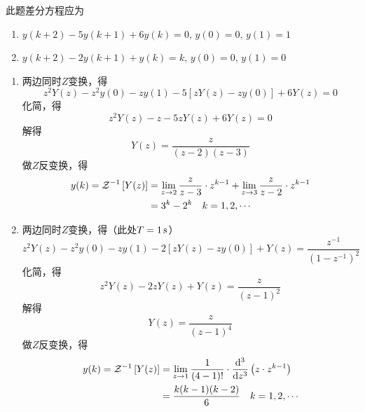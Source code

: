 \begin{exercise} %
    此题差分方程应为
    \begin{enumerate}
        \item $y(k+2) - 5y(k+1) + 6y(k) = 0,\, y(0) = 0,\, y(1) = 1$
        \item $y(k+2) - 2y(k+1) + y(k) = k,\, y(0) = 0,\,y(1) = 0$
    \end{enumerate}

    \begin{enumerate}
        \item 两边同时$Z$变换，得
        \begin{equation*}
            z^2 Y(z) - z^2 y(0) - z y(1) - 5[z Y(z) - zy(0)] + 6Y(z) = 0
        \end{equation*}
        化简，得
        \begin{equation*}
            z^2 Y(z) - z - 5z Y(z) + 6Y(z) = 0
        \end{equation*}
        解得
        \begin{equation*}
            Y(z) = \frac{z}{(z-2)(z-3)}
        \end{equation*}
        做$Z$反变换，得
        \begin{align*}
            y(k) = {\mathcal{Z}}^{-1}\left[Y(z)\right] &= \lim_{z \to 2} \frac{z}{z-3} \cdot z^{k-1} + \lim_{z \to 3} \frac{z}{z-2} \cdot z^{k-1} \\
            &= 3^k - 2^k \quad k = 1, 2, \cdots
        \end{align*}
        \item 两边同时$Z$变换，得（此处$T=1\,{\rm s}$）
        \begin{equation*}
            z^2 Y(z) - z^2 y(0) - z y(1) - 2[z Y(z) - zy(0)] + Y(z) = \frac{z^{-1}}{(1-z^{-1})^2}
        \end{equation*}
        化简，得
        \begin{equation*}
            z^2 Y(z) - 2z Y(z) + Y(z) = \frac{z}{(z-1)^2}
        \end{equation*}
        解得
        \begin{equation*}
            Y(z) = \frac{z}{(z-1)^4}
        \end{equation*}
        做$Z$反变换，得
        \begin{align*}
            y(k) = {\mathcal{Z}}^{-1}\left[Y(z)\right] &= \lim_{z \to 1} \frac{1}{(4-1)!} \cdot \frac{{\rm{d}}^{3}}{{\rm{d}}{z}^{3}} \left(z\cdot z^{k-1}\right) \\
            &= \frac{k(k-1)(k-2)}{6} \quad k = 1, 2, \cdots
        \end{align*}
    \end{enumerate}
\end{exercise}
